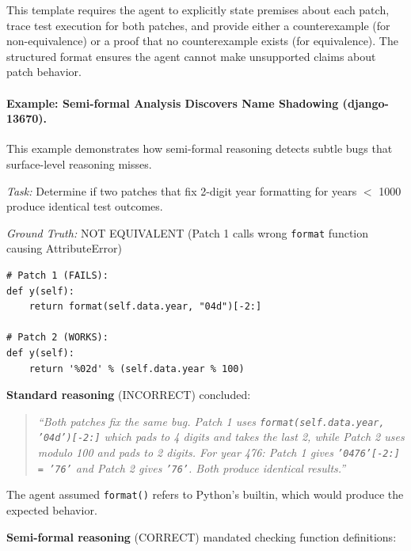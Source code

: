 \documentclass[]{meta}
\begin{document}
This template requires the agent to explicitly state premises about each patch, trace test execution for both patches, and provide either a counterexample (for non-equivalence) or a proof that no counterexample exists (for equivalence). The structured format ensures the agent cannot make unsupported claims about patch behavior.

\paragraph{Example: Semi-formal Analysis Discovers Name Shadowing (django-13670).}
This example demonstrates how semi-formal reasoning detects subtle bugs that surface-level reasoning misses.

\emph{Task:} Determine if two patches that fix 2-digit year formatting for years $<$ 1000 produce identical test outcomes.

\emph{Ground Truth:} NOT EQUIVALENT (Patch 1 calls wrong \texttt{format} function causing AttributeError)

\begin{tcolorbox}[colback=gray!5, colframe=gray!50, boxrule=0.3pt, breakable, title=Patch Comparison]
\small
\begin{verbatim}
# Patch 1 (FAILS):
def y(self):
    return format(self.data.year, "04d")[-2:]

# Patch 2 (WORKS):
def y(self):
    return '%02d' % (self.data.year % 100)
\end{verbatim}
\end{tcolorbox}

\textbf{Standard reasoning} (INCORRECT) concluded:
\begin{quote}
\emph{``Both patches fix the same bug. Patch 1 uses \texttt{format(self.data.year, '04d')[-2:]} which pads to 4 digits and takes the last 2, while Patch 2 uses modulo 100 and pads to 2 digits. For year 476: Patch 1 gives \texttt{'0476'[-2:] = '76'} and Patch 2 gives \texttt{'76'}. Both produce identical results.''}
\end{quote}

The agent assumed \texttt{format()} refers to Python's builtin, which would produce the expected behavior.

\textbf{Semi-formal reasoning} (CORRECT) mandated checking function definitions:
\end{document}
